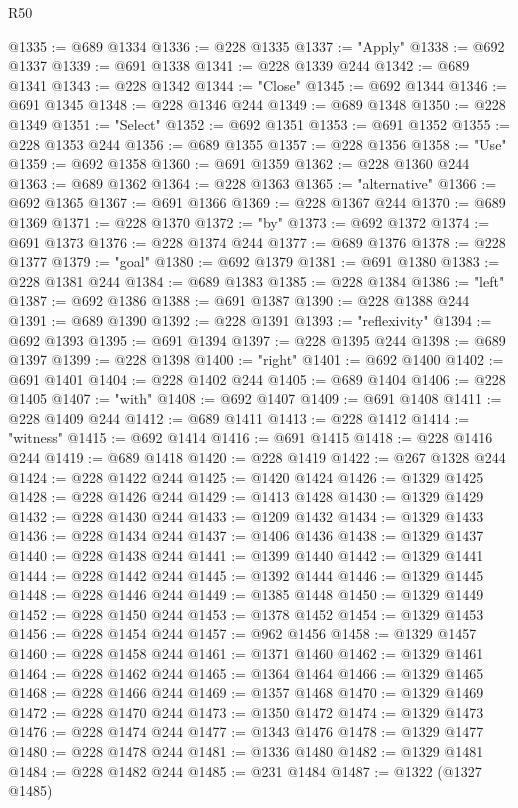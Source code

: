 \begin{lexlean}{R50}
\begin{coremodule}
@1335 := @689 @1334
@1336 := @228 @1335
@1337 := "Apply"
@1338 := @692 @1337
@1339 := @691 @1338
@1341 := @228 @1339 @244
@1342 := @689 @1341
@1343 := @228 @1342
@1344 := "Close"
@1345 := @692 @1344
@1346 := @691 @1345
@1348 := @228 @1346 @244
@1349 := @689 @1348
@1350 := @228 @1349
@1351 := "Select"
@1352 := @692 @1351
@1353 := @691 @1352
@1355 := @228 @1353 @244
@1356 := @689 @1355
@1357 := @228 @1356
@1358 := "Use"
@1359 := @692 @1358
@1360 := @691 @1359
@1362 := @228 @1360 @244
@1363 := @689 @1362
@1364 := @228 @1363
@1365 := "alternative"
@1366 := @692 @1365
@1367 := @691 @1366
@1369 := @228 @1367 @244
@1370 := @689 @1369
@1371 := @228 @1370
@1372 := "by"
@1373 := @692 @1372
@1374 := @691 @1373
@1376 := @228 @1374 @244
@1377 := @689 @1376
@1378 := @228 @1377
@1379 := "goal"
@1380 := @692 @1379
@1381 := @691 @1380
@1383 := @228 @1381 @244
@1384 := @689 @1383
@1385 := @228 @1384
@1386 := "left"
@1387 := @692 @1386
@1388 := @691 @1387
@1390 := @228 @1388 @244
@1391 := @689 @1390
@1392 := @228 @1391
@1393 := "reflexivity"
@1394 := @692 @1393
@1395 := @691 @1394
@1397 := @228 @1395 @244
@1398 := @689 @1397
@1399 := @228 @1398
@1400 := "right"
@1401 := @692 @1400
@1402 := @691 @1401
@1404 := @228 @1402 @244
@1405 := @689 @1404
@1406 := @228 @1405
@1407 := "with"
@1408 := @692 @1407
@1409 := @691 @1408
@1411 := @228 @1409 @244
@1412 := @689 @1411
@1413 := @228 @1412
@1414 := "witness"
@1415 := @692 @1414
@1416 := @691 @1415
@1418 := @228 @1416 @244
@1419 := @689 @1418
@1420 := @228 @1419
@1422 := @267 @1328 @244
@1424 := @228 @1422 @244
@1425 := @1420 @1424
@1426 := @1329 @1425
@1428 := @228 @1426 @244
@1429 := @1413 @1428
@1430 := @1329 @1429
@1432 := @228 @1430 @244
@1433 := @1209 @1432
@1434 := @1329 @1433
@1436 := @228 @1434 @244
@1437 := @1406 @1436
@1438 := @1329 @1437
@1440 := @228 @1438 @244
@1441 := @1399 @1440
@1442 := @1329 @1441
@1444 := @228 @1442 @244
@1445 := @1392 @1444
@1446 := @1329 @1445
@1448 := @228 @1446 @244
@1449 := @1385 @1448
@1450 := @1329 @1449
@1452 := @228 @1450 @244
@1453 := @1378 @1452
@1454 := @1329 @1453
@1456 := @228 @1454 @244
@1457 := @962 @1456
@1458 := @1329 @1457
@1460 := @228 @1458 @244
@1461 := @1371 @1460
@1462 := @1329 @1461
@1464 := @228 @1462 @244
@1465 := @1364 @1464
@1466 := @1329 @1465
@1468 := @228 @1466 @244
@1469 := @1357 @1468
@1470 := @1329 @1469
@1472 := @228 @1470 @244
@1473 := @1350 @1472
@1474 := @1329 @1473
@1476 := @228 @1474 @244
@1477 := @1343 @1476
@1478 := @1329 @1477
@1480 := @228 @1478 @244
@1481 := @1336 @1480
@1482 := @1329 @1481
@1484 := @228 @1482 @244
@1485 := @231 @1484
@1487 := @1322 (@1327 @1485)

\end{coremodule}
\end{lexlean}
